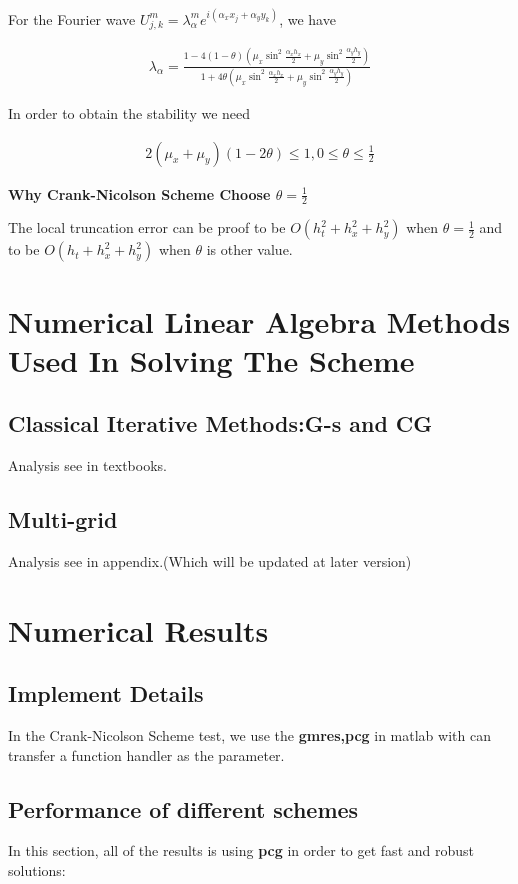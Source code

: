 \documentclass[12pt]{amsart}
\begin{document}
For the Fourier wave $U_{j,k}^m=\lambda_\alpha^me^{i(\alpha_xx_j+\alpha_yy_k)}$,  we have

\begin{align*}
\lambda_\alpha=\frac{1-4(1-\theta)(\mu_x\sin^2\frac{\alpha_xh_x}{2}+\mu_y\sin^2\frac{\alpha_yh_y}{2})}{1+4\theta(\mu_x\sin^2\frac{\alpha_xh_x}{2}+\mu_y\sin^2\frac{\alpha_yh_y}{2})}
\end{align*}

In order to obtain the stability we need

\begin{align*}
2(\mu_x+\mu_y)(1-2\theta)\le 1, 0\le \theta\le \frac{1}{2}
\end{align*}

\textbf{Why Crank-Nicolson Scheme Choose $\theta=\frac{1}{2}$}

The local truncation error can be proof to be $O(h_t^2+h_x^2+h_y^2)$ when  $\theta=\frac{1}{2}$ and to be $O(h_t+h_x^2+h_y^2)$ when $\theta$ is other value.

\section{Numerical Linear Algebra Methods Used In Solving The Scheme}

\subsection{Classical Iterative Methods:G-s and CG} Analysis see in textbooks.

\subsection{Multi-grid} Analysis see in appendix.(Which will be updated at later version)

\section{Numerical Results}

\subsection{Implement Details}

In the Crank-Nicolson Scheme test, we use the \textbf{gmres,pcg} in matlab with can transfer a function handler as the parameter. 

\subsection{Performance of different schemes}  
In this section, all of the results is using \textbf{pcg} in order to get fast and robust solutions:
\end{document}

